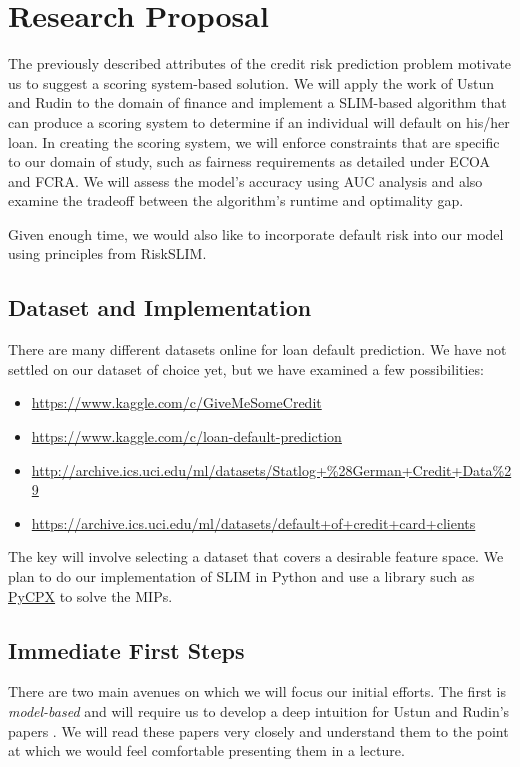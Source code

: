 \documentclass[11pt, margin=1in]{article}
\begin{document}
\section{Research Proposal}
The previously described attributes of the credit risk prediction problem motivate us to suggest a scoring system-based solution.  We will apply the work of Ustun and Rudin to the domain of finance and implement a SLIM-based algorithm that can produce a scoring system to determine if an individual will default on his/her loan.  In creating the scoring system, we will enforce constraints that are specific to our domain of study, such as fairness requirements as detailed under ECOA and FCRA.  We will assess the model's accuracy using AUC analysis and also examine the tradeoff between the algorithm's runtime and optimality gap.  

Given enough time, we would also like to incorporate default risk into our model using principles from RiskSLIM.  
  
\subsection{Dataset and Implementation}
There are many different datasets online for loan default prediction.  We have not settled on our dataset of choice yet, but we have examined a few possibilities:
\begin{itemize}
\item \url{https://www.kaggle.com/c/GiveMeSomeCredit}
\item \url{https://www.kaggle.com/c/loan-default-prediction}
\item \url{http://archive.ics.uci.edu/ml/datasets/Statlog+\%28German+Credit+Data\%29}
\item \url{https://archive.ics.uci.edu/ml/datasets/default+of+credit+card+clients}
\end{itemize}
The key will involve selecting a dataset that covers a desirable feature space.  We plan to do our implementation of SLIM in Python and use a library such as \href{https://www.stat.washington.edu/~hoytak/code/pycpx/index.html}{PyCPX} to solve the MIPs.  

\subsection{Immediate First Steps}
There are two main avenues on which we will focus our initial efforts.  The first is \emph{model-based} and will require us to develop a deep intuition for Ustun and Rudin's papers \cite{slim, risk-slim}.  We will read these papers very closely and understand them to the point at which we would feel comfortable presenting them in a lecture.      
\end{document}
